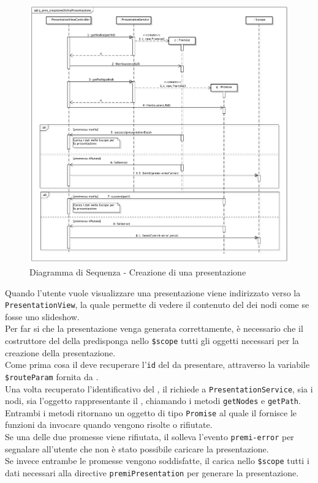 \begin{center}
\begin{figure}[h]
\centering
\includegraphics[scale=0.25,keepaspectratio]{diagrammi/sequenza/FrontEnd/controllers/q_pres_creazioneDiUnaPresentazione.pdf}
\caption{Diagramma di Sequenza - Creazione di una presentazione}
\end{figure}
\end{center}
\FloatBarrier
Quando l'utente vuole visualizzare una presentazione viene indirizzato verso la \texttt{PresentationView}, la quale permette di vedere il contenuto del  dei nodi come se fosse uno slideshow.\\
Per far si che la presentazione venga generata correttamente, è necessario che il costruttore del  della  predisponga nello \texttt{\$scope} tutti gli oggetti necessari per la creazione della presentazione.\\
Come prima cosa il  deve recuperare l'\texttt{id} del  da presentare, attraverso la variabile \texttt{\$routeParam} fornita da .\\
Una volta recuperato l'identificativo del , il  richiede a \texttt{PresentationService}, sia i nodi, sia l'oggetto rappresentante il , chiamando i metodi \texttt{getNodes} e \texttt{getPath}.\\
Entrambi i metodi ritornano un oggetto di tipo \texttt{Promise} al quale il  fornisce le funzioni da invocare quando vengono risolte o rifiutate.\\
Se una delle due promesse viene rifiutata, il  solleva l'evento \texttt{premi-error} per segnalare all'utente che non è stato possibile caricare la presentazione.\\
Se invece entrambe le promesse vengono soddisfatte, il  carica nello \texttt{\$scope} tutti i dati necessari alla directive \texttt{premiPresentation} per generare la presentazione.
